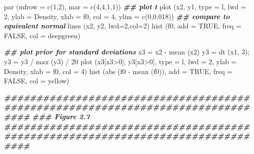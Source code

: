 \documentclass[
]{book}
\newenvironment{Shaded}{\begin{snugshade}}{\end{snugshade}}
\newcommand{\AttributeTok}[1]{\textcolor[rgb]{0.77,0.63,0.00}{#1}}
\newcommand{\ConstantTok}[1]{\textcolor[rgb]{0.00,0.00,0.00}{#1}}
\newcommand{\DecValTok}[1]{\textcolor[rgb]{0.00,0.00,0.81}{#1}}
\newcommand{\DocumentationTok}[1]{\textcolor[rgb]{0.56,0.35,0.01}{\textbf{\textit{#1}}}}
\newcommand{\FloatTok}[1]{\textcolor[rgb]{0.00,0.00,0.81}{#1}}
\newcommand{\FunctionTok}[1]{\textcolor[rgb]{0.00,0.00,0.00}{#1}}
\newcommand{\NormalTok}[1]{#1}
\newcommand{\OtherTok}[1]{\textcolor[rgb]{0.56,0.35,0.01}{#1}}
\newcommand{\SpecialCharTok}[1]{\textcolor[rgb]{0.00,0.00,0.00}{#1}}
\newcommand{\StringTok}[1]{\textcolor[rgb]{0.31,0.60,0.02}{#1}}
\begin{document}
\begin{Shaded}
\begin{Highlighting}[]
\FunctionTok{par}\NormalTok{ (}\AttributeTok{mfrow =} \FunctionTok{c}\NormalTok{(}\DecValTok{1}\NormalTok{,}\DecValTok{2}\NormalTok{), }\AttributeTok{mar =} \FunctionTok{c}\NormalTok{(}\DecValTok{4}\NormalTok{,}\DecValTok{4}\NormalTok{,}\DecValTok{1}\NormalTok{,}\DecValTok{1}\NormalTok{))}
\DocumentationTok{\#\# plot t}
\FunctionTok{plot}\NormalTok{ (x2, y1, }\AttributeTok{type =} \StringTok{\textquotesingle{}l\textquotesingle{}}\NormalTok{, }\AttributeTok{lwd =} \DecValTok{2}\NormalTok{, }\AttributeTok{ylab =} \StringTok{\textquotesingle{}Density\textquotesingle{}}\NormalTok{, }\AttributeTok{xlab =} \StringTok{\textquotesingle{}f0\textquotesingle{}}\NormalTok{, }\AttributeTok{col =} \DecValTok{4}\NormalTok{, }\AttributeTok{ylim =} \FunctionTok{c}\NormalTok{(}\DecValTok{0}\NormalTok{,}\FloatTok{0.018}\NormalTok{))}
\DocumentationTok{\#\# compare to equivalent normal}
\FunctionTok{lines}\NormalTok{ (x2, y2, }\AttributeTok{lwd=}\DecValTok{2}\NormalTok{,}\AttributeTok{col=}\DecValTok{2}\NormalTok{)}
\FunctionTok{hist}\NormalTok{ (f0, }\AttributeTok{add =} \ConstantTok{TRUE}\NormalTok{, }\AttributeTok{freq =} \ConstantTok{FALSE}\NormalTok{, }\AttributeTok{col =}\NormalTok{ deepgreen)}


\DocumentationTok{\#\# plot prior for standard deviations}
\NormalTok{x3 }\OtherTok{=}\NormalTok{ x2 }\SpecialCharTok{{-}} \FunctionTok{mean}\NormalTok{ (x2)}
\NormalTok{y3 }\OtherTok{=} \FunctionTok{dt}\NormalTok{ (x1, }\DecValTok{3}\NormalTok{); y3 }\OtherTok{=}\NormalTok{ y3 }\SpecialCharTok{/} \FunctionTok{max}\NormalTok{ (y3) }\SpecialCharTok{/} \DecValTok{20}
\FunctionTok{plot}\NormalTok{ (x3[x3}\SpecialCharTok{\textgreater{}}\DecValTok{0}\NormalTok{], y3[x3}\SpecialCharTok{\textgreater{}}\DecValTok{0}\NormalTok{], }\AttributeTok{type =} \StringTok{\textquotesingle{}l\textquotesingle{}}\NormalTok{, }\AttributeTok{lwd =} \DecValTok{2}\NormalTok{, }\AttributeTok{ylab =} \StringTok{\textquotesingle{}Density\textquotesingle{}}\NormalTok{, }
      \AttributeTok{xlab =} \StringTok{\textquotesingle{}f0\textquotesingle{}}\NormalTok{, }\AttributeTok{col =} \DecValTok{4}\NormalTok{)}
\FunctionTok{hist}\NormalTok{ (}\FunctionTok{abs}\NormalTok{ (f0 }\SpecialCharTok{{-}} \FunctionTok{mean}\NormalTok{ (f0)), }\AttributeTok{add =} \ConstantTok{TRUE}\NormalTok{, }\AttributeTok{freq =} \ConstantTok{FALSE}\NormalTok{, }\AttributeTok{col =}\NormalTok{ yellow)}

\DocumentationTok{\#\#\#\#\#\#\#\#\#\#\#\#\#\#\#\#\#\#\#\#\#\#\#\#\#\#\#\#\#\#\#\#\#\#\#\#\#\#\#\#\#\#\#\#\#\#\#\#\#\#\#\#\#\#\#\#\#\#\#\#\#\#\#\#\#\#\#\#\#\#\#\#\#\#\#\#\#\#\#\#}
\DocumentationTok{\#\#\# Figure 2.7}
\DocumentationTok{\#\#\#\#\#\#\#\#\#\#\#\#\#\#\#\#\#\#\#\#\#\#\#\#\#\#\#\#\#\#\#\#\#\#\#\#\#\#\#\#\#\#\#\#\#\#\#\#\#\#\#\#\#\#\#\#\#\#\#\#\#\#\#\#\#\#\#\#\#\#\#\#\#\#\#\#\#\#\#\#}


\end{Highlighting}
\end{Shaded}
\end{document}
